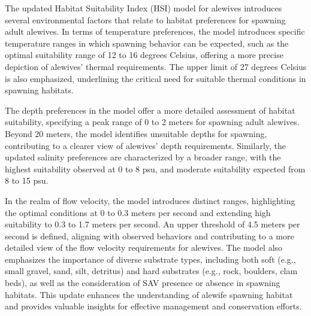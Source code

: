 \documentclass[
]{book}
\begin{document}
The updated Habitat Suitability Index (HSI) model for alewives introduces several environmental factors that relate to habitat preferences for spawning adult alewives. In terms of temperature preferences, the model introduces specific temperature ranges in which spawning behavior can be expected, such as the optimal suitability range of 12 to 16 degrees Celsius, offering a more precise depiction of alewives' thermal requirements. The upper limit of 27 degrees Celsius is also emphasized, underlining the critical need for suitable thermal conditions in spawning habitats.

The depth preferences in the model offer a more detailed assessment of habitat suitability, specifying a peak range of 0 to 2 meters for spawning adult alewives. Beyond 20 meters, the model identifies unsuitable depths for spawning, contributing to a clearer view of alewives' depth requirements. Similarly, the updated salinity preferences are characterized by a broader range, with the highest suitability observed at 0 to 8 psu, and moderate suitability expected from 8 to 15 psu.

In the realm of flow velocity, the model introduces distinct ranges, highlighting the optimal conditions at 0 to 0.3 meters per second and extending high suitability to 0.3 to 1.7 meters per second. An upper threshold of 4.5 meters per second is defined, aligning with observed behaviors and contributing to a more detailed view of the flow velocity requirements for alewives. The model also emphasizes the importance of diverse substrate types, including both soft (e.g., small gravel, sand, silt, detritus) and hard substrates (e.g., rock, boulders, clam beds), as well as the consideration of SAV presence or absence in spawning habitats. This update enhances the understanding of alewife spawning habitat and provides valuable insights for effective management and conservation efforts.
\end{document}
